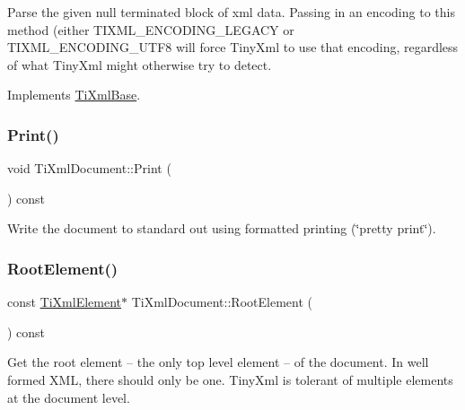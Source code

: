 Parse the given null terminated block of xml data. Passing in an encoding to this method (either T\+I\+X\+M\+L\+\_\+\+E\+N\+C\+O\+D\+I\+N\+G\+\_\+\+L\+E\+G\+A\+CY or T\+I\+X\+M\+L\+\_\+\+E\+N\+C\+O\+D\+I\+N\+G\+\_\+\+U\+T\+F8 will force Tiny\+Xml to use that encoding, regardless of what Tiny\+Xml might otherwise try to detect. 

Implements \hyperlink{class_ti_xml_base}{Ti\+Xml\+Base}.

\mbox{\label{class_ti_xml_document_aa4e8c1498a76dcde7191c683e1220882}} 
\subsubsection{\texorpdfstring{Print()}{Print()}}
{\footnotesize\ttfamily void Ti\+Xml\+Document\+::\+Print (\begin{DoxyParamCaption}{ }\end{DoxyParamCaption}) const\hspace{0.3cm}{\ttfamily [inline]}}

Write the document to standard out using formatted printing (\char`\"{}pretty print\char`\"{}). \mbox{\label{class_ti_xml_document_ab54e3a93279fcf0ac80f06ed9c52f04a}} 
\subsubsection{\texorpdfstring{Root\+Element()}{RootElement()}}
{\footnotesize\ttfamily const \hyperlink{class_ti_xml_element}{Ti\+Xml\+Element}$\ast$ Ti\+Xml\+Document\+::\+Root\+Element (\begin{DoxyParamCaption}{ }\end{DoxyParamCaption}) const\hspace{0.3cm}{\ttfamily [inline]}}

Get the root element -- the only top level element -- of the document. In well formed X\+ML, there should only be one. Tiny\+Xml is tolerant of multiple elements at the document level. \mbox{\label{class_ti_xml_document_a51dac56316f89b35bdb7d0d433ba988e}} 
